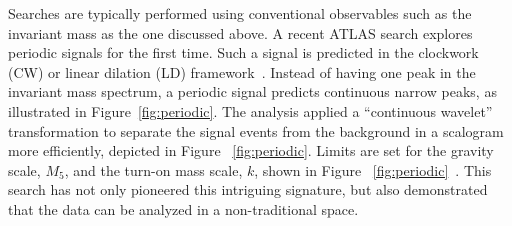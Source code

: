 \documentclass{moriond}
\begin{document}
Searches are typically performed using conventional observables such as the
invariant mass as the one discussed above. A recent ATLAS search explores
periodic signals for the first time. Such a signal is predicted in the
clockwork (CW) or linear dilation (LD) framework~\cite{clock}. Instead of having one peak in
the invariant mass spectrum, a periodic signal predicts continuous narrow
peaks, as illustrated in Figure~\ref{fig:periodic}. The analysis applied a
``continuous wavelet'' transformation to separate the signal events from the
background in a scalogram more efficiently, depicted in Figure
~\ref{fig:periodic}. Limits are set for the gravity scale, $M_{5}$, and the
turn-on mass scale, $k$, shown in Figure ~\ref{fig:periodic}~\cite{period}.
This search has not only pioneered this intriguing signature, but also
demonstrated that the data can be analyzed in a non-traditional space.\\        
\end{document}
